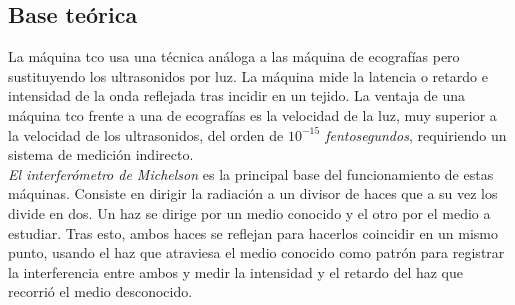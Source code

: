 \subsection{Base teórica}
La máquina \gls{tco} usa una técnica análoga a las máquina de
ecografías pero sustituyendo los ultrasonidos por luz. La máquina mide
la latencia o retardo e intensidad de la onda reflejada tras incidir
en un tejido. La ventaja de una máquina \gls{tco} frente a una de
ecografías es la velocidad de la luz, muy superior a la velocidad de
los ultrasonidos, del orden de \emph{$10^{-15}$ fentosegundos},
requiriendo un sistema de medición indirecto.\\
\emph{El interferómetro de Michelson} es la principal base del
funcionamiento de estas máquinas. Consiste en dirigir la radiación a
un divisor de haces que a su vez los divide en dos. Un haz se dirige
por un medio conocido y el otro por el medio a estudiar. Tras esto,
ambos haces se reflejan para hacerlos coincidir en un mismo punto,
usando el haz que atraviesa el medio conocido como patrón para
registrar la interferencia entre ambos y medir la intensidad y el
retardo del haz que recorrió el medio desconocido.

